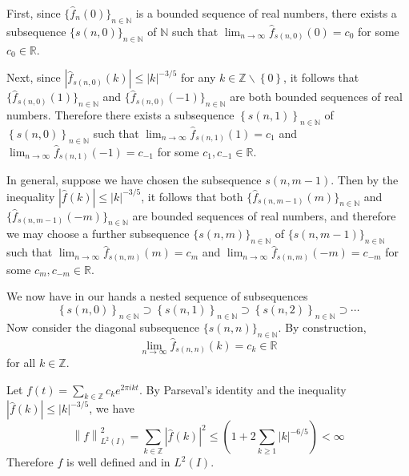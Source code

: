 \documentclass{exam}
\theoremstyle{problemstyle}
\newcommand{\norm}[1]{\left\lVert#1\right\rVert} %
\newcommand{\1}[1]{\textbf{1}_{\left[#1\right]}} %
\def\limn{\lim_{n\to\infty}} %
\def\R{\mathbb{R}} %
\def\Z{\mathbb{Z}} %
\begin{document}
\begin{questions}
\begin{parts}
\begin{solution}
  
  First, since $\{\hat{f}_{n}(0)\}_{n\in\mathbb{N}}$ is a bounded sequence of real numbers, there exists a subsequence $\{s(n,0)\}_{n\in \mathbb{N}}$ of $\mathbb{N}$ such that $\limn \hat{f}_{s(n,0)}(0)= c_{0}$ for some $c_{0}\in \R$.

  Next, since $|\hat{f}_{s(n,0)}(k)|\leq |k|^{-3/5}$ for any $k\in \Z\backslash \left\{ 0 \right\}$, it follows that  $\{\hat{f}_{s(n,0)}(1)\}_{n\in\mathbb{N}}$ and $\{\hat{f}_{s(n,0)}(-1)\}_{n\in\mathbb{N}}$ are both bounded sequences of real numbers. Therefore there exists a subsequence $\left\{ s(n,1) \right\}_{n\in \mathbb{N}}$ of  $\left\{ s(n,0) \right\}_{n\in \mathbb{N}}$ such that $\limn \hat{f}_{s(n,1)}(1) = c_{1}$ and $\limn \hat{f}_{s(n,1)}(-1) = c_{-1}$ for some $c_{1},c_{-1}\in \R$.
  
  In general, suppose we have chosen the subsequence $s(n,m-1)$. Then by the inequality $|\hat{f}(k)|\leq |k|^{-3/5}$, it follows that both $\{\hat{f}_{s(n,m-1)}(m)\}_{n\in\mathbb{N}}$ and $\{\hat{f}_{s(n,m-1)}(-m)\}_{n\in\mathbb{N}}$ are bounded sequences of real numbers, and therefore we may choose a further subsequence $\{s(n,m)\}_{n\in\mathbb{N}}$ of $\{s(n,m-1)\}_{n\in\mathbb{N}}$ such that 
  $\limn \hat{f}_{s(n,m)}(m) = c_{m}$ and $\limn \hat{f}_{s(n,m)}(-m) = c_{-m}$ for some $c_{m},c_{-m}\in \R$.

  We now have in our hands a nested sequence of subsequences
  \begin{equation*}
    \left\{ s(n,0) \right\}_{n\in\mathbb{N}}\supset  \left\{ s(n,1) \right\}_{n\in\mathbb{N}}\supset \left\{ s(n,2) \right\}_{n\in\mathbb{N}}\supset \cdots
  \end{equation*}
  Now consider the diagonal subsequence $\{s(n,n)\}_{n\in \mathbb{N}}$. By construction,
  \begin{equation}
    \label{eq:1}
    \lim_{n\to\infty} \hat{f}_{s(n,n)}(k) =c_{k}\in \R
  \end{equation}
  for all $k\in \Z$.

  Let $f(t)=\sum_{k\in\Z} c_{k}e^{2\pi i k t}$. By Parseval's identity and the inequality $|\hat{f}(k)|\leq |k|^{-3/5}$, we have
  \begin{equation*}
    \norm{f}^{2}_{L^{2}(I)} =  \sum_{k\in\Z}|\hat{f}(k)|^{2} \leq  \left( 1 + 2\sum_{k\geq 1}|k|^{-6/5} \right)<\infty
  \end{equation*}
  Therefore $f$ is well defined and in $L^{2}(I)$.
  

\end{solution}
\end{parts}
\end{questions}
\end{document}

